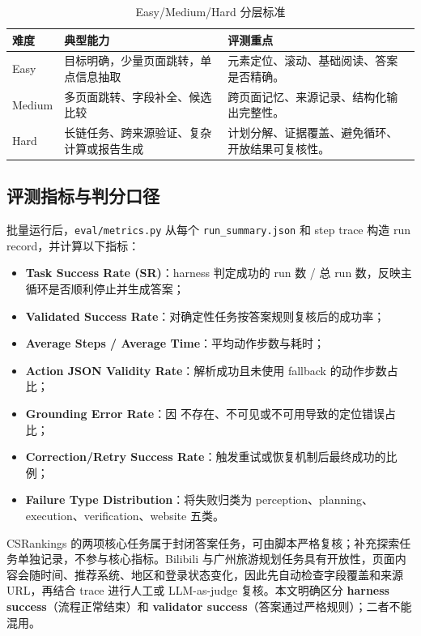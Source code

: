 \begin{table}[H]
  \centering
  \caption{Easy/Medium/Hard 分层标准}
  \label{tab:difficulty}
  \small
  \begin{tabularx}{\textwidth}{p{}p{}Y}
    \toprule
    难度 & 典型能力 & 评测重点 \\
    \midrule
    Easy & 目标明确，少量页面跳转，单点信息抽取 & 元素定位、滚动、基础阅读、答案是否精确。\\
    Medium & 多页面跳转、字段补全、候选比较 & 跨页面记忆、来源记录、结构化输出完整性。\\
    Hard & 长链任务、跨来源验证、复杂计算或报告生成 & 计划分解、证据覆盖、避免循环、开放结果可复核性。\\
    \bottomrule
  \end{tabularx}
\end{table}

\subsection{评测指标与判分口径}

批量运行后，\texttt{eval/metrics.py} 从每个 \texttt{run\_summary.json} 和 step trace 构造 run record，并计算以下指标：
\begin{itemize}
  \item \textbf{Task Success Rate (SR)}：harness 判定成功的 run 数 / 总 run 数，反映主循环是否顺利停止并生成答案；
  \item \textbf{Validated Success Rate}：对确定性任务按答案规则复核后的成功率；
  \item \textbf{Average Steps / Average Time}：平均动作步数与耗时；
  \item \textbf{Action JSON Validity Rate}：解析成功且未使用 fallback 的动作步数占比；
  \item \textbf{Grounding Error Rate}：因  不存在、不可见或不可用导致的定位错误占比；
  \item \textbf{Correction/Retry Success Rate}：触发重试或恢复机制后最终成功的比例；
  \item \textbf{Failure Type Distribution}：将失败归类为 perception、planning、execution、verification、website 五类。
\end{itemize}

CSRankings 的两项核心任务属于封闭答案任务，可由脚本严格复核；补充探索任务单独记录，不参与核心指标。Bilibili 与广州旅游规划任务具有开放性，页面内容会随时间、推荐系统、地区和登录状态变化，因此先自动检查字段覆盖和来源 URL，再结合 trace 进行人工或 LLM-as-judge 复核。本文明确区分 \textbf{harness success}（流程正常结束）和 \textbf{validator success}（答案通过严格规则）；二者不能混用。

